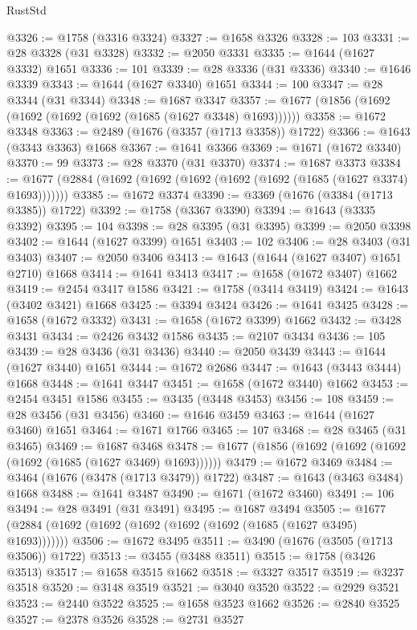 \begin{lexlean}{RustStd}
\begin{coremodule}
@3326 := @1758 (@3316 @3324)
@3327 := @1658 @3326
@3328 := 103
@3331 := @28 @3328 (@31 @3328)
@3332 := @2050 @3331
@3335 := @1644 (@1627 @3332) @1651
@3336 := 101
@3339 := @28 @3336 (@31 @3336)
@3340 := @1646 @3339
@3343 := @1644 (@1627 @3340) @1651
@3344 := 100
@3347 := @28 @3344 (@31 @3344)
@3348 := @1687 @3347
@3357 := @1677 (@1856 (@1692 (@1692 (@1692 (@1692 (@1685 (@1627 @3348) @1693))))))
@3358 := @1672 @3348
@3363 := @2489 (@1676 (@3357 (@1713 @3358)) @1722)
@3366 := @1643 (@3343 @3363) @1668
@3367 := @1641 @3366
@3369 := @1671 (@1672 @3340)
@3370 := 99
@3373 := @28 @3370 (@31 @3370)
@3374 := @1687 @3373
@3384 := @1677 (@2884 (@1692 (@1692 (@1692 (@1692 (@1692 (@1685 (@1627 @3374) @1693)))))))
@3385 := @1672 @3374
@3390 := @3369 (@1676 (@3384 (@1713 @3385)) @1722)
@3392 := @1758 (@3367 @3390)
@3394 := @1643 (@3335 @3392)
@3395 := 104
@3398 := @28 @3395 (@31 @3395)
@3399 := @2050 @3398
@3402 := @1644 (@1627 @3399) @1651
@3403 := 102
@3406 := @28 @3403 (@31 @3403)
@3407 := @2050 @3406
@3413 := @1643 (@1644 (@1627 @3407) @1651 @2710) @1668
@3414 := @1641 @3413
@3417 := @1658 (@1672 @3407) @1662
@3419 := @2454 @3417 @1586
@3421 := @1758 (@3414 @3419)
@3424 := @1643 (@3402 @3421) @1668
@3425 := @3394 @3424
@3426 := @1641 @3425
@3428 := @1658 (@1672 @3332)
@3431 := @1658 (@1672 @3399) @1662
@3432 := @3428 @3431
@3434 := @2426 @3432 @1586
@3435 := @2107 @3434
@3436 := 105
@3439 := @28 @3436 (@31 @3436)
@3440 := @2050 @3439
@3443 := @1644 (@1627 @3440) @1651
@3444 := @1672 @2686
@3447 := @1643 (@3443 @3444) @1668
@3448 := @1641 @3447
@3451 := @1658 (@1672 @3440) @1662
@3453 := @2454 @3451 @1586
@3455 := @3435 (@3448 @3453)
@3456 := 108
@3459 := @28 @3456 (@31 @3456)
@3460 := @1646 @3459
@3463 := @1644 (@1627 @3460) @1651
@3464 := @1671 @1766
@3465 := 107
@3468 := @28 @3465 (@31 @3465)
@3469 := @1687 @3468
@3478 := @1677 (@1856 (@1692 (@1692 (@1692 (@1692 (@1685 (@1627 @3469) @1693))))))
@3479 := @1672 @3469
@3484 := @3464 (@1676 (@3478 (@1713 @3479)) @1722)
@3487 := @1643 (@3463 @3484) @1668
@3488 := @1641 @3487
@3490 := @1671 (@1672 @3460)
@3491 := 106
@3494 := @28 @3491 (@31 @3491)
@3495 := @1687 @3494
@3505 := @1677 (@2884 (@1692 (@1692 (@1692 (@1692 (@1692 (@1685 (@1627 @3495) @1693)))))))
@3506 := @1672 @3495
@3511 := @3490 (@1676 (@3505 (@1713 @3506)) @1722)
@3513 := @3455 (@3488 @3511)
@3515 := @1758 (@3426 @3513)
@3517 := @1658 @3515 @1662
@3518 := @3327 @3517
@3519 := @3237 @3518
@3520 := @3148 @3519
@3521 := @3040 @3520
@3522 := @2929 @3521
@3523 := @2440 @3522
@3525 := @1658 @3523 @1662
@3526 := @2840 @3525
@3527 := @2378 @3526
@3528 := @2731 @3527

\end{coremodule}
\end{lexlean}
